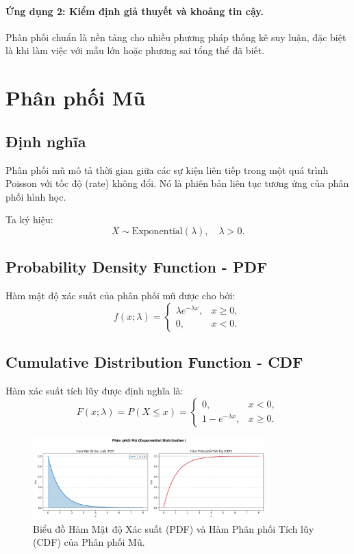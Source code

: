 \paragraph{Ứng dụng 2: Kiểm định giả thuyết và khoảng tin cậy.}  
Phân phối chuẩn là nền tảng cho nhiều phương pháp thống kê suy luận, 
đặc biệt là khi làm việc với mẫu lớn hoặc phương sai tổng thể đã biết.  


\section{Phân phối Mũ}

\subsection{Định nghĩa}

Phân phối mũ mô tả thời gian giữa các sự kiện liên tiếp trong một quá trình Poisson với tốc độ (rate) không đổi.  
Nó là phiên bản liên tục tương ứng của phân phối hình học.  

Ta ký hiệu:
\[
X \sim \mathrm{Exponential}(\lambda), \quad \lambda>0.
\]

\subsection{Probability Density Function - PDF}

Hàm mật độ xác suất của phân phối mũ được cho bởi:
\[
f(x;\lambda) = 
\begin{cases}
\lambda e^{-\lambda x}, & x \ge 0, \\
0, & x < 0.
\end{cases}
\]

\subsection{Cumulative Distribution Function - CDF}

Hàm xác suất tích lũy được định nghĩa là:
\[
F(x;\lambda) = P(X \le x) =
\begin{cases}
0, & x < 0,\\[0.5em]
1 - e^{-\lambda x}, & x \ge 0.
\end{cases}
\]

\begin{figure}[h!]
 \centering
 \includegraphics[width=0.8\textwidth]{images/Exp_PDF_and_CDF.png}
\caption{Biểu đồ Hàm Mật độ Xác suất (PDF) và Hàm Phân phối Tích lũy (CDF) của Phân phối Mũ.}
\label{fig:exponential_dist}
\end{figure}

